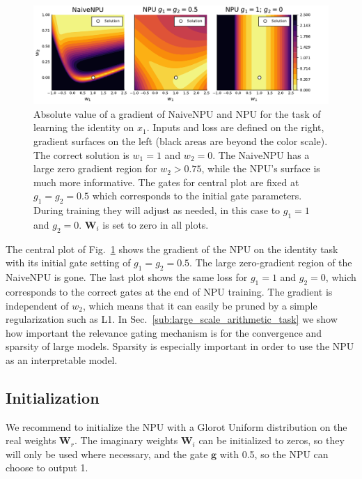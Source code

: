 \documentclass[9pt]{article}
\newcommand{\Wre}{\bm W_{r}}
\newcommand{\Wim}{\bm W_{i}}
\begin{document}
\begin{figure}
  \centering
  \begin{minipage}{0.55\textwidth}
    \includegraphics[width=\textwidth]{npu_gatednpu_id_grad.pdf}
  \end{minipage}
  \begin{minipage}{0.42\textwidth}
  \end{minipage}
  \caption{Absolute value of a gradient of NaiveNPU and NPU for the task
  of learning the identity on $x_1$. Inputs and
  loss are defined on the right, gradient surfaces on the left
  (black areas are beyond the color scale). The correct solution is
  $w_1=1$ and $w_2=0$.  The NaiveNPU has a large zero gradient region for
  $w_2>0.75$, while the NPU's surface is much more informative. The gates
  for central plot are fixed at $g_1=g_2=0.5$ which corresponds to the initial
  gate parameters. During training they will adjust as needed, in this case to
  $g_1=1$ and $g_2=0$. $\bm W_i$ is set to zero in all plots.
  }%
  \label{fig:id_loss}
\end{figure}
The central plot of Fig.~\ref{fig:id_loss} shows the gradient of the NPU
on the identity task with its initial gate setting of $g_1=g_2=0.5$. The
large zero-gradient region of the NaiveNPU is gone. The last plot shows the
same loss for $g_1=1$ and $g_2=0$, which corresponds to the correct gates at
the end of NPU training. The gradient is independent of $w_2$, which
means that it can easily be pruned by a simple regularization such as L1.  In
Sec.~\ref{sub:large_scale_arithmetic_task} we show how important the relevance
gating mechanism is for the convergence and sparsity of large models.  Sparsity
is especially important in order to use the NPU as an interpretable model.

\subsection{Initialization}%
\label{sub:initialization}
We recommend to initialize the NPU with a Glorot Uniform distribution on the
real weights $\Wre$. The imaginary weights $\Wim$ can be initialized to zeros,
so they will only be used where necessary, and the gate $\bm g$ with 0.5, so
the NPU can choose to output 1.
\end{document}
